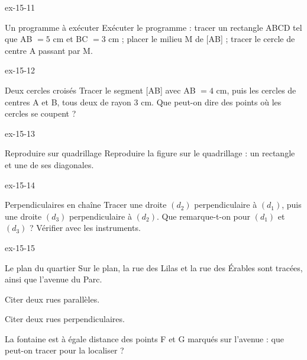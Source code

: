 \begin{blocLivre}{ex-15-11}\begin{exercice}[3]{Un programme à exécuter}
Exécuter le programme : tracer un rectangle ABCD tel que AB $=5$ cm et BC $=3$ cm ; placer le milieu M de [AB] ; tracer le cercle de centre A passant par M.
\label{fig-ex-15-11}
\end{exercice}\end{blocLivre}
\begin{blocLivre}{ex-15-12}\begin{exercice}[3]{Deux cercles croisés}
Tracer le segment [AB] avec AB $=4$ cm, puis les cercles de centres A et B, tous deux de rayon 3 cm. Que peut-on dire des points où les cercles se coupent ?
\label{fig-ex-15-12}
\end{exercice}\end{blocLivre}
\begin{blocLivre}{ex-15-13}\begin{exercice}[3]{Reproduire sur quadrillage}
Reproduire la figure sur le quadrillage : un rectangle et une de ses diagonales.
\label{fig-ex-15-13}
\end{exercice}\end{blocLivre}
\begin{blocLivre}{ex-15-14}\begin{exercice}[3]{Perpendiculaires en chaîne}
Tracer une droite $(d_2)$ perpendiculaire à $(d_1)$, puis une droite $(d_3)$ perpendiculaire à $(d_2)$. Que remarque-t-on pour $(d_1)$ et $(d_3)$ ? Vérifier avec les instruments.
\label{fig-ex-15-14}
\end{exercice}\end{blocLivre}
\begin{blocLivre}{ex-15-15}\begin{exercice}[3]{Le plan du quartier}
Sur le plan, la rue des Lilas et la rue des Érables sont tracées, ainsi que l’avenue du Parc.\begin{questions}
\item Citer deux rues parallèles.
\item Citer deux rues perpendiculaires.
\item La fontaine est à égale distance des points F et G marqués sur l’avenue : que peut-on tracer pour la localiser ?
\end{questions}
\label{fig-ex-15-15}
\end{exercice}\end{blocLivre}

\clearpage
